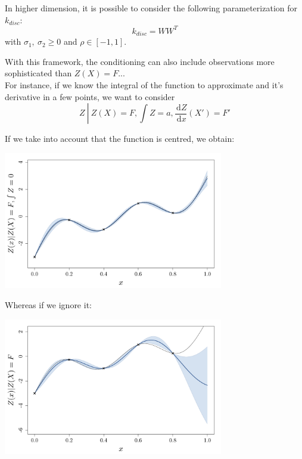 \documentclass{beamer}
\newcommand\dx{\, \mathrm{d}}
\begin{document}
\begin{frame}{}
In higher dimension, it is possible to consider the following parameterization for $k_{disc}$:
\small
$$k_{disc} = W W^T$$
\normalsize
with  $\sigma_1,\ \sigma_2 \geq 0$ and $\rho \in [-1,1]$.
\vspace{5mm}

\end{frame}

\begin{frame}{}
With this framework, the conditioning can also include observations more sophisticated than $Z(X)=F$... \\
\vspace{5mm}
For instance, if we know the integral of the function to approximate and it's derivative in a few points, we want to consider
$$ Z \ \left| \ Z(X) = F, \int Z = a, \frac{\dx Z}{\dx x}(X')= F' \right. $$
\end{frame}

\begin{frame}{}
\begin{example}
	If we take into account that the function is centred, we obtain:
	\begin{center}
	\includegraphics[height=6cm]{figures/R/exotic_int}
	\end{center}
\end{example}
\end{frame}

\begin{frame}{}
\begin{example}
	Whereas if we ignore it:
	\begin{center}
	\includegraphics[height=6cm]{figures/R/exotic_pasint}
	\end{center}
\end{example}
\end{frame}
\end{document}
